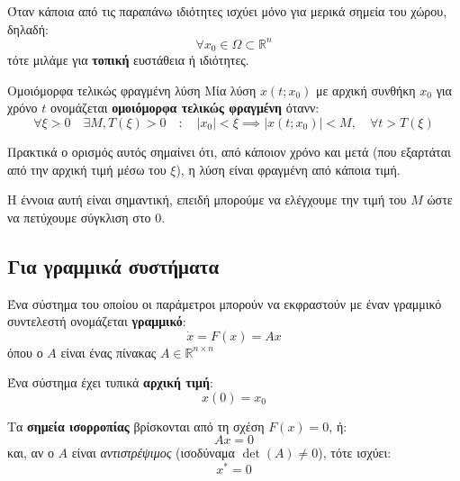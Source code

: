 \documentclass[11pt,a4paper,notitlepage,fleqn]{article}
\begin{document}
Όταν κάποια από τις παραπάνω ιδιότητες ισχύει μόνο για μερικά σημεία του χώρου, δηλαδή:
\[
\forall x_0 \in \Omega \subset \mathbb R^n
\]
τότε μιλάμε για \textbf{τοπική} ευστάθεια ή ιδιότητες.

\begin{defn}{Ομοιόμορφα τελικώς φραγμένη λύση}{}
	Μία λύση \( x(t;x_0) \) με αρχική συνθήκη \( x_0 \) για χρόνο \( t \) ονομάζεται
	\textbf{ομοιόμορφα τελικώς φραγμένη} ότανν:
	\[
	\forall \xi > 0 \quad
	\exists M,T(\xi) > 0
	\quad : \quad
	\left|x_0\right| < \xi \implies \left|
	x(t;x_0)\right| < M
	, \quad \forall t > T(\xi)
	\]
\end{defn}
Πρακτικά ο ορισμός αυτός σημαίνει ότι, από κάποιον χρόνο και μετά (που
εξαρτάται από την αρχική τιμή μέσω του \( \xi \)), η λύση είναι φραγμένη
από κάποια τιμή.


Η έννοια αυτή είναι σημαντική, επειδή μπορούμε να ελέγχουμε την τιμή του \( M \) ώστε να
πετύχουμε σύγκλιση στο 0.


\subsection{Για γραμμικά συστήματα}
\label{sec:linear_stability}
Ένα σύστημα του οποίου οι παράμετροι μπορούν να εκφραστούν με έναν γραμμικό
συντελεστή ονομάζεται \textbf{γραμμικό}:
\[
\dot x = F(x) = Ax
\] όπου ο \( A \) είναι ένας πίνακας \( A \in \mathbb R^{n\times n} \)

Ένα σύστημα έχει τυπικά \textbf{αρχική τιμή}:
\[
x(0) = x_0
\]

Τα \textbf{σημεία ισορροπίας} βρίσκονται από τη σχέση \( F(x) = 0 \), ή:
\[
Ax = 0
\]
και, αν ο \( A \) είναι \textit{αντιστρέψιμος} (ισοδύναμα \( \det(A)\neq 0 \)), τότε ισχύει:\[
x^* = 0
\]
\end{document}
